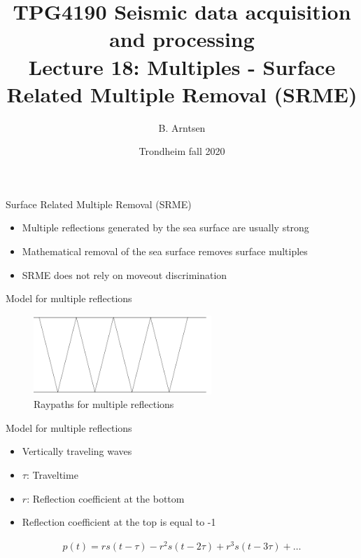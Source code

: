 \documentclass[xcolor=dvipsnames,notes]{beamer}
\begin{document}
\title{TPG4190 Seismic data acquisition and processing \\
               Lecture 18: Multiples - Surface Related Multiple Removal (SRME)}
\author{B. Arntsen}
\date{Trondheim fall 2020}
\begin{frame}
 \titlepage
\end{frame}
%
\begin{frame}{Surface Related Multiple Removal (SRME)}
\begin{itemize}
   \item Multiple reflections generated by the sea surface are usually strong
   \item Mathematical removal of the sea surface removes surface multiples
   \item SRME does not rely on moveout discrimination
\end{itemize}
\end{frame}
%
\begin{frame}{Model for multiple reflections}
\begin{figure}
\includegraphics[width=0.6\textwidth]{Fig/mult.pdf}
\caption{Raypaths for multiple reflections}
\end{figure}
\end{frame}
%
%
\begin{frame}{Model for multiple reflections}
\begin{itemize} 
  \item Vertically traveling waves
  \item $\tau$: Traveltime
  \item $r$: Reflection coefficient at the bottom
  \item Reflection coefficient at the top is equal to -1
\end{itemize}
%
\begin{eqnarray}
 p(t) = r s(t-\tau) - r^2 s(t-2\tau) +  r^3 s(t-3\tau) + \ldots
                                \label{eq:mult}
\end{eqnarray}
\end{frame}
\end{document}
